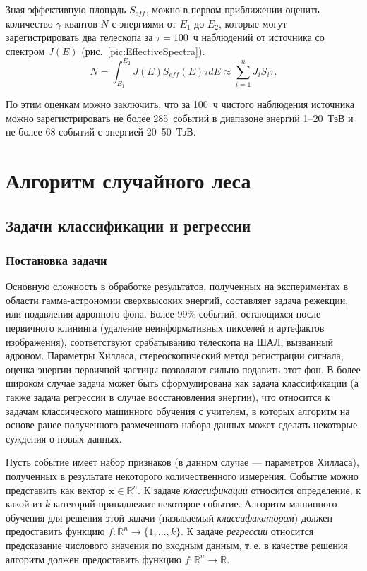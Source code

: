 \documentclass[magd,floatypics,numeref]{msudipl} %
\begin{document}
Зная эффективную площадь $S_{eff}$, можно в первом приближении оценить количество $\gamma$-квантов $N$ с энергиями от $E_1$ до $E_2$, которые могут зарегистрировать два телескопа за $\tau = 100$~ч наблюдений от источника со спектром $J(E)$ (рис.~\ref{pic:EffectiveSpectra}\afterpage{\clearpage}).
\begin{equation}
N = \int^{E_2}_{E_1} J(E) S_{eff}(E)\tau dE \approx \sum^n_{i = 1} J_i S_i \tau.
\end{equation}

По этим оценкам можно заключить, что за 100~ч чистого наблюдения источника можно зарегистрировать не более 285~событий в диапазоне энергий 1--20~ТэВ и не более 68 событий с энергией 20--50~ТэВ.
\chapter{Алгоритм случайного леса}
\section{Задачи классификации и регрессии}
\subsection{Постановка задачи}
Основную сложность в обработке результатов, полученных на экспериментах в области гамма-астрономии сверхвысоких энергий, составляет задача режекции, или подавления адронного фона. Более 99\% событий, остающихся после первичного клининга (удаление неинформативных пикселей и артефактов изображения), соответствуют срабатыванию телескопа на ШАЛ, вызванный адроном. Параметры Хилласа, стереоскопический метод регистрации сигнала, оценка энергии первичной частицы позволяют сильно подавить этот фон. В более широком случае задача может быть сформулирована как задача классификации (а также задача регрессии в случае восстановления энергии), что относится к задачам классического машинного обучения с учителем, в которых алгоритм на основе ранее полученного размеченного набора данных может сделать некоторые суждения о новых данных. 

Пусть событие имеет набор признаков (в данном случае --- параметров Хилласа), полученных в результате некоторого количественного измерения. Событие можно представить как вектор 
$\mathbf{x}\in \mathds{R}^n$. К задаче \textit{классификации} относится определение, к какой из $k$ категорий принадлежит некоторое событие. Алгоритм машинного обучения для решения этой задачи (называемый \textit{классификатором}) должен предоставить функцию $f: \mathds{R}^n \rightarrow \{ 1, \dots, k\}$. К задаче \textit{регрессии} относится предсказание числового значения по входным данным, т.\,е. в качестве решения алгоритм должен предоставить функцию $f: \mathds{R}^n \rightarrow  \mathds{R}$. 
\end{document}
